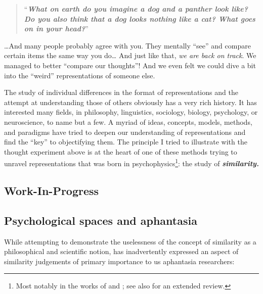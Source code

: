\documentclass[
  authoryear]{elsarticle}
\begin{document}
\begin{quote}
``\textbf{\emph{What on earth do you imagine a dog and a panther look
like? Do you also think that a dog looks nothing like a cat? What goes
on in your head?}}''
\end{quote}

\ldots And many people probably agree with you. They mentally ``see''
and compare certain items the same way you do\ldots{} And just like
that, \emph{we are back on track}. We managed to better ``compare our
thoughts''! And we even felt we could dive a bit into the ``weird''
representations of someone else.

The study of individual differences in the format of representations and
the attempt at understanding those of others obviously has a very rich
history. It has interested many fields, in philosophy, linguistics,
sociology, biology, psychology, or neuroscience, to name but a few. A
myriad of ideas, concepts, models, methods, and paradigms have tried to
deepen our understanding of representations and find the ``key'' to
objectifying them. The principle I tried to illustrate with the thought
experiment above is at the heart of one of these methods trying to
unravel representations that was born in psychophysics\footnote{Most
  notably in the works of \citet{fechner1860} and \citet{mach1890a}; see
  also \citet{roads2024} for an extended review.}: the study of
\textbf{\emph{similarity.}}

\subsection{Work-In-Progress}\label{work-in-progress}

\subsection{Psychological spaces and
aphantasia}\label{psychological-spaces-and-aphantasia}

While attempting to demonstrate the uselessness of the concept of
similarity as a philosophical and scientific notion,
\citet{goodmanSevenStricturesSimilarity1972} has inadvertently expressed
an aspect of similarity judgements of primary importance to us
aphantasia researchers:
\end{document}
